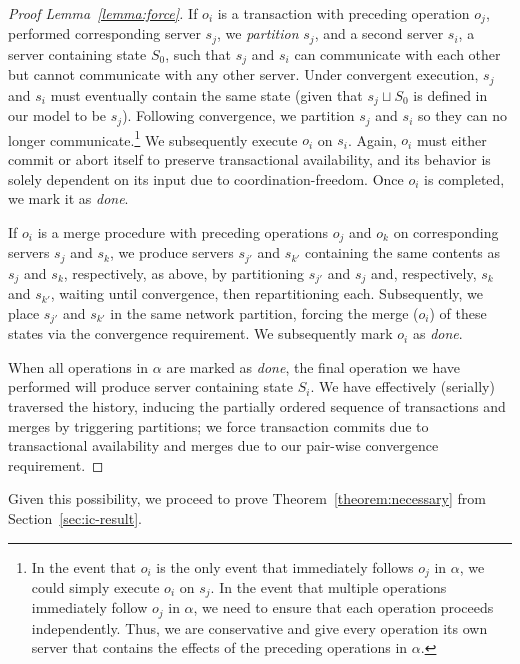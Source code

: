 \begin{proof}[Proof Lemma~\ref{lemma:force}]
If $o_i$ is a transaction with preceding operation $o_j$, performed
corresponding server $s_j$, we \textit{partition} $s_j$, and a second
server $s_i$, a server containing state $S_0$, such that $s_j$ and
$s_i$ can communicate with each other but cannot communicate with any
other server. Under convergent execution, $s_j$ and $s_i$ must
eventually contain the same state (given that $s_j \sqcup S_0$ is
defined in our model to be $s_j$). Following convergence, we partition
$s_j$ and $s_i$ so they can no longer communicate.\footnote{In the
  event that $o_i$ is the only event that immediately follows $o_j$ in
  $\alpha$, we could simply execute $o_i$ on $s_j$. In the event that
  multiple operations immediately follow $o_j$ in $\alpha$, we need to
  ensure that each operation proceeds independently. Thus, we are
  conservative and give every operation its own server that contains
  the effects of the preceding operations in $\alpha$.} We
subsequently execute $o_i$ on $s_i$. Again, $o_i$ must either commit
or abort itself to preserve transactional availability, and its
behavior is solely dependent on its input due to
coordination-freedom. Once $o_i$ is completed, we mark it as
\textit{done}.

If $o_i$ is a merge procedure with preceding operations $o_j$ and
$o_k$ on corresponding servers $s_j$ and $s_k$, we produce servers
$s_{j'}$ and $s_{k'}$ containing the same contents as $s_j$ and $s_k$,
respectively, as above, by partitioning $s_{j'}$ and $s_{j}$ and,
respectively, $s_{k}$ and $s_{k'}$, waiting until convergence, then
repartitioning each. Subsequently, we place $s_{j'}$ and $s_{k'}$ in
the same network partition, forcing the merge ($o_i$) of these states
via the convergence requirement. We subsequently mark $o_i$ as
\textit{done}.

When all operations in $\alpha$ are marked as \textit{done}, the
final operation we have performed will produce server containing state
$S_i$. We have effectively (serially) traversed the history, inducing
the partially ordered sequence of transactions and merges by
triggering partitions; we force transaction commits due to
transactional availability and merges due to our pair-wise
convergence requirement.
\end{proof}

Given this possibility, we proceed to prove
Theorem~\ref{theorem:necessary} from Section~\ref{sec:ic-result}.

